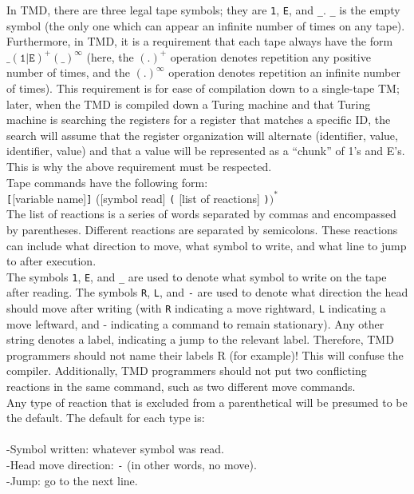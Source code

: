 \documentclass[11pt]{article}
\begin{document}
In TMD, there are three legal tape symbols; they are \texttt{1}, \texttt{E}, and \texttt{\_}. \texttt{\_} is the empty symbol (the only one which can appear an infinite number of times on any tape). Furthermore, in TMD, it is a requirement that each tape always have the form $\texttt{\_}(\texttt{1}|\texttt{E})^{+}(\texttt{\_})^{\infty}$ (here, the $(.)^+$ operation denotes repetition any positive number of times, and the $(.)^\infty$ operation denotes repetition an infinite number of times). This requirement is for ease of compilation down to a single-tape TM; later, when the TMD is compiled down a Turing machine and that Turing machine is searching the registers for a register that matches a specific ID, the search will assume that the register organization will alternate (identifier, value, identifier, value) and that a value will be represented as a ``chunk'' of 1's and E's. This is why the above requirement must be respected. \\

Tape commands have the following form: \\

\texttt{[}[variable name]\texttt{]} ([symbol read] \texttt{(} [list of reactions] \texttt{)}$)^*$ \\

The list of reactions is a series of words separated by commas and encompassed by parentheses. Different reactions are separated by semicolons. These reactions can include what direction to move, what symbol to write, and what line to jump to after execution. \\

The symbols \texttt{1}, \texttt{E}, and \texttt{\_} are used to denote what symbol to write on the tape after reading. The symbols \texttt{R}, \texttt{L}, and \texttt{-} are used to denote what direction the head should move after writing (with \texttt{R} indicating a move rightward, \texttt{L} indicating a move leftward, and \textrm{-} indicating a command to remain stationary). Any other string denotes a label, indicating a jump to the relevant label. Therefore, TMD programmers should not name their labels \textrm{R} (for example)! This will confuse the compiler. Additionally, TMD programmers should not put two conflicting reactions in the same command, such as two different move commands. \\

Any type of reaction that is excluded from a parenthetical will be presumed to be the default. The default for each type is: \\ \\
-Symbol written: whatever symbol was read. \\
-Head move direction: \texttt{-} (in other words, no move). \\
-Jump: go to the next line. \\
\end{document}
